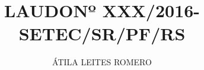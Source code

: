 \def \pfdoctype {LAUDO}
\def \pfdocsubtype {\MakeUppercase{Informática}}
\def \pfdocdate {XXX}
\def \pfdocnum {XXX}
\def \pfdocyear {2016}
\def \pfipl {XXX}
\def \pfclient {do Delegado de Polícia Federal \MakeUppercase{XXX}}
\def \pfexptype {memorando}
\def \pfexpnum {XXX}
\def \pfexpdate {XXX}
\def \pfregnum {XXX}
\def \pfregdate {XXX}
\def \pfauthor {\MakeUppercase{Átila Leites Romero}}
\def \pfauthorclass {Especial}
\def \pfauthormatr {10.388}
\title{\pfdoctype\space Nº \pfdocnum/\pfdocyear\space - SETEC/SR/PF/RS}
\author{\pfauthor}

